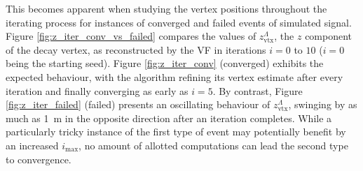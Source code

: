 This becomes apparent when studying the vertex positions throughout the iterating process for instances of converged and failed events of simulated signal.
Figure \ref{fig:z_iter_conv_vs_failed} compares the values of $z_\text{vtx}^\Lambda$, the $z$ component of the \lambdadecay decay vertex, as reconstructed by the VF in iterations $i=0$ to $10$ ($i=0$ being the starting seed).
Figure \ref{fig:z_iter_conv} (converged) exhibits the expected behaviour, with the algorithm refining its vertex estimate after every iteration and finally converging as early as $i=5$.
By contrast, Figure \ref{fig:z_iter_failed} (failed) presents an oscillating behaviour of $z_\text{vtx}^\Lambda$, swinging by as much as \SI{1}{\meter} in the opposite direction after an iteration completes.
While a particularly tricky instance of the first type of event may potentially benefit by an increased $i_\text{max}$, no amount of allotted computations can lead the second type to convergence.

